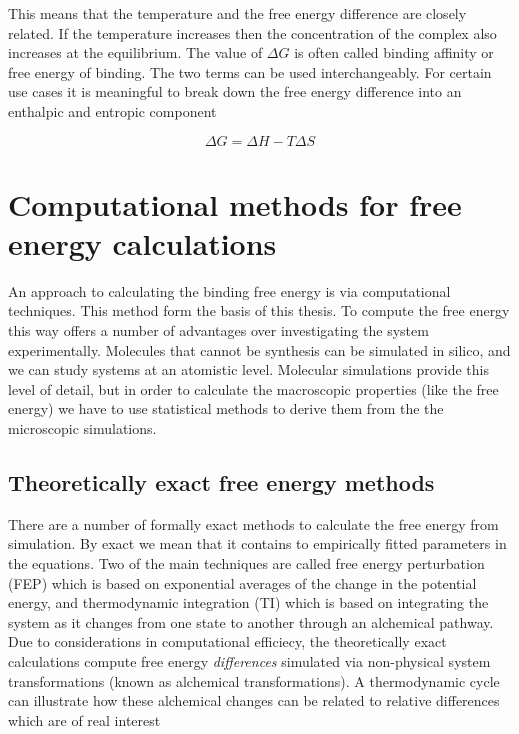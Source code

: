 \documentclass{report}
\begin{document}
This means that the temperature and the free energy difference are closely related. If the temperature increases then the concentration of the complex also increases at the equilibrium. The value of $\Delta G$ is often called binding affinity or free energy of binding. The two terms can be used interchangeably. For certain use cases it is meaningful to break down the free energy difference into an enthalpic and entropic component

\begin{equation}
  \Delta G = \Delta H - T \Delta S
\end{equation} 

\section{Computational methods for free energy calculations}

An approach to calculating the binding free energy is via computational techniques. This method form the basis of this thesis. To compute the free energy this way offers a number of advantages over investigating the system experimentally. Molecules that cannot be synthesis can be simulated in silico, and we can study systems at an atomistic level. Molecular simulations provide this level of detail, but in order to calculate the macroscopic properties (like the free energy) we have to use statistical methods to derive them from the the microscopic simulations.

\subsection{Theoretically exact free energy methods}

There are a number of formally exact methods to calculate the free energy from simulation. By exact we mean that it contains to empirically fitted parameters in the equations. Two of the main techniques are called free energy perturbation (FEP) which is based on exponential averages of the change in the potential energy, and thermodynamic integration (TI) which is based on integrating the system as it changes from one state to another through an alchemical pathway. Due to considerations in computational efficiecy, the theoretically exact calculations compute free energy \emph{differences} simulated via non-physical system transformations (known as alchemical transformations). A thermodynamic cycle can illustrate how these alchemical changes can be related to relative differences which are of real interest
\end{document}
